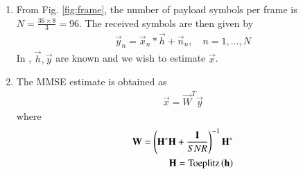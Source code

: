 \begin{enumerate}[label=\thesubsection.\arabic*.,ref=\thesubsection.\theenumi]


\item From Fig. \ref{fig:frame}, the number of payload symbols per frame is $N=\frac{36 \times 8}{3} = 96$.
The received symbols are then given by 
\begin{align}
\vec{y}_n = \vec{x}_n*\vec{h}+ \vec{n}_n, \quad n = 1, \dots, N
\label{eq:mmse_payload_chan_mod}
\end{align}
%
In \label{eq:mmse_payload_chan_mod}, $\vec{h}, \vec{y}$ are known and we wish to estimate $\vec{x}$.

\item The MMSE estimate is obtained as
\begin{align}
\vec{x} = \vec{W}^T\vec{y}
\end{align}
where 
\begin{align}
\mathbf{W} = \left(\mathbf{H}^*\mathbf{H}+\frac{ \mathbf{I}}{SNR}\right)^{-1}\mathbf{H}^{*}
\\
\mathbf{H} = \text{Toeplitz}\left(\mathbf{h}\right)
\end{align}

\end{enumerate}
